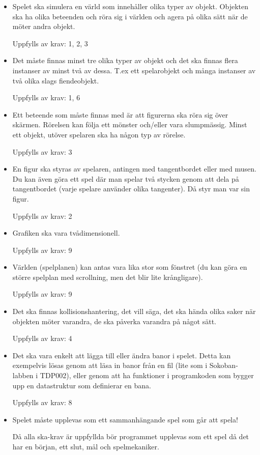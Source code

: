 \documentclass{TDP005mall}
\begin{document}
\begin{itemize}
\item Spelet ska simulera en värld som innehåller olika typer av objekt. Objekten ska ha olika beteenden och röra sig i världen och agera på olika sätt när de möter andra objekt.

Uppfylls av krav: 1, 2, 3
\item Det måste finnas minst tre olika typer av objekt och det ska finnas flera instanser av minst två av dessa. T.ex ett spelarobjekt och många instanser av två olika slags fiendeobjekt.

Uppfylls av krav: 1, 6
\item Ett beteende som måste finnas med är att figurerna ska röra sig över skärmen. Rörelsen kan följa ett mönster och/eller vara slumpmässig. Minst ett objekt, utöver spelaren ska ha någon typ av rörelse.

Uppfylls av krav: 3
\item En figur ska styras av spelaren, antingen med tangentbordet eller med musen. Du kan även göra ett spel där man spelar två stycken genom att dela på tangentbordet (varje spelare använder olika tangenter). Då styr man var sin figur.

Uppfylls av krav: 2
\item Grafiken ska vara tvådimensionell.

Uppfylls av krav: 9
\item Världen (spelplanen) kan antas vara lika stor som fönstret (du kan göra en större spelplan med scrollning, men det blir lite krångligare).

Uppfylls av krav: 9
\item Det ska finnas kollisionshantering, det vill säga, det ska hända olika saker när objekten möter varandra, de ska påverka varandra på något sätt. 

Uppfylls av krav: 4
\item Det ska vara enkelt att lägga till eller ändra banor i spelet. Detta kan exempelvis lösas genom att läsa in banor från en fil (lite som i Sokoban-labben i TDP002), eller genom att ha funktioner i programkoden som bygger upp en datastruktur som definierar en bana.

Uppfylls av krav: 8
\item Spelet måste upplevas som ett sammanhängande spel som går att spela!

Då alla ska-krav är uppfyllda bör programmet upplevas som ett spel då det har en början, ett slut, mål och spelmekaniker. 
\end{itemize}
\end{document}
